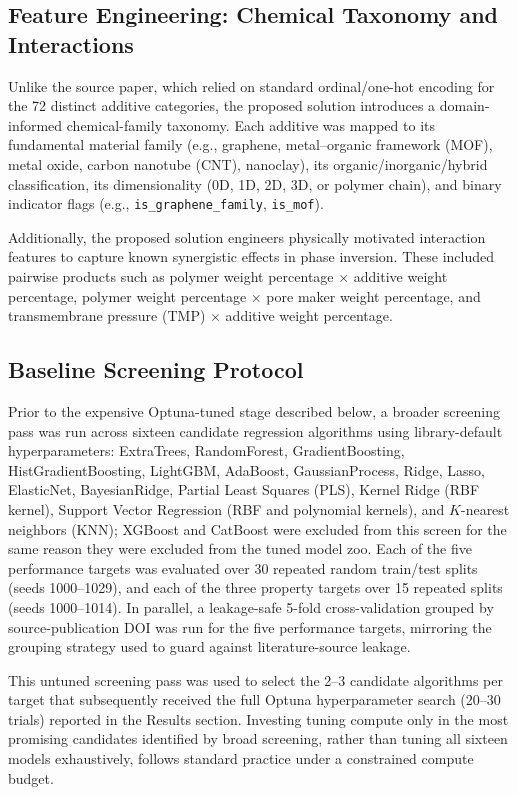 \documentclass[11pt]{article}
\begin{document}
\subsection{Feature Engineering: Chemical Taxonomy and Interactions}

Unlike the source paper, which relied on standard ordinal/one-hot encoding for the 72 distinct additive categories, the proposed solution introduces a domain-informed chemical-family taxonomy. Each additive was mapped to its fundamental material family (e.g., graphene, metal--organic framework (MOF), metal oxide, carbon nanotube (CNT), nanoclay), its organic/inorganic/hybrid classification, its dimensionality (0D, 1D, 2D, 3D, or polymer chain), and binary indicator flags (e.g., \texttt{is\_graphene\_family}, \texttt{is\_mof}).

Additionally, the proposed solution engineers physically motivated interaction features to capture known synergistic effects in phase inversion. These included pairwise products such as polymer weight percentage $\times$ additive weight percentage, polymer weight percentage $\times$ pore maker weight percentage, and transmembrane pressure (TMP) $\times$ additive weight percentage.

\subsection{Baseline Screening Protocol}

Prior to the expensive Optuna-tuned stage described below, a broader screening pass was run across sixteen candidate regression algorithms using library-default hyperparameters: ExtraTrees, RandomForest, GradientBoosting, HistGradientBoosting, LightGBM, AdaBoost, GaussianProcess, Ridge, Lasso, ElasticNet, BayesianRidge, Partial Least Squares (PLS), Kernel Ridge (RBF kernel), Support Vector Regression (RBF and polynomial kernels), and $K$-nearest neighbors (KNN); XGBoost and CatBoost were excluded from this screen for the same reason they were excluded from the tuned model zoo. Each of the five performance targets was evaluated over 30 repeated random train/test splits (seeds 1000--1029), and each of the three property targets over 15 repeated splits (seeds 1000--1014). In parallel, a leakage-safe 5-fold cross-validation grouped by source-publication DOI was run for the five performance targets, mirroring the grouping strategy used to guard against literature-source leakage.

This untuned screening pass was used to select the 2--3 candidate algorithms per target that subsequently received the full Optuna hyperparameter search (20--30 trials) reported in the Results section. Investing tuning compute only in the most promising candidates identified by broad screening, rather than tuning all sixteen models exhaustively, follows standard practice under a constrained compute budget.
\end{document}
